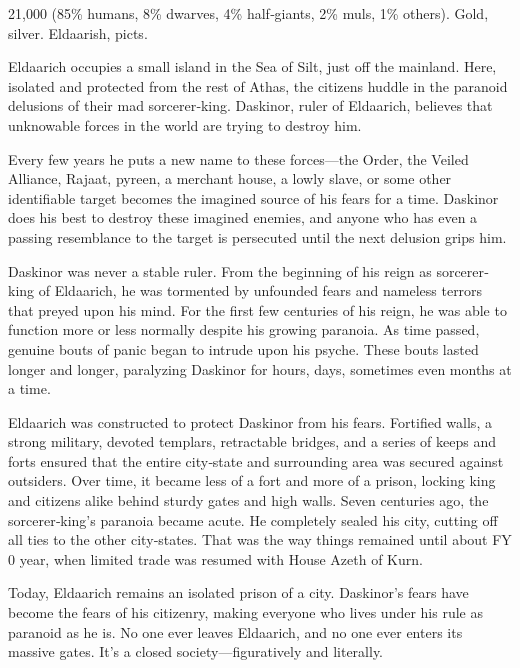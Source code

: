 {21,000 (85\% humans, 8\% dwarves, 4\% half‐giants, 2\% muls, 1\% others).}
{Gold, silver.}
{Eldaarish, picts.}
{
	Eldaarich occupies a small island in the Sea of Silt, just off the mainland. Here, isolated and protected from the rest of Athas, the citizens huddle in the paranoid delusions of their mad sorcerer‐king. Daskinor, ruler of Eldaarich, believes that unknowable forces in the world are trying to destroy him.

	Every few years he puts a new name to these forces---the Order, the Veiled Alliance, Rajaat, pyreen, a merchant house, a lowly slave, or some other identifiable target becomes the imagined source of his fears for a time. Daskinor does his best to destroy these imagined enemies, and anyone who has even a passing resemblance to the target is persecuted until the next delusion grips him.

	Daskinor was never a stable ruler. From the beginning of his reign as sorcerer‐king of Eldaarich, he was tormented by unfounded fears and nameless terrors that preyed upon his mind. For the first few centuries of his reign, he was able to function more or less normally despite his growing paranoia. As time passed, genuine bouts of panic began to intrude upon his psyche. These bouts lasted longer and longer, paralyzing Daskinor for hours, days, sometimes even months at a time.

	Eldaarich was constructed to protect Daskinor from his fears. Fortified walls, a strong military, devoted templars, retractable bridges, and a series of keeps and forts ensured that the entire city‐state and surrounding area was secured against outsiders. Over time, it became less of a fort and more of a prison, locking king and citizens alike behind sturdy gates and high walls. Seven centuries ago, the sorcerer‐king’s paranoia became acute. He completely sealed his city, cutting off all ties to the other city‐states. That was the way things remained until about FY 0 year, when limited trade was resumed with House Azeth of Kurn.

	Today, Eldaarich remains an isolated prison of a city. Daskinor’s fears have become the fears of his citizenry, making everyone who lives under his rule as paranoid as he is. No one ever leaves Eldaarich, and no one ever enters its massive gates. It’s a closed society---figuratively and literally.
}
